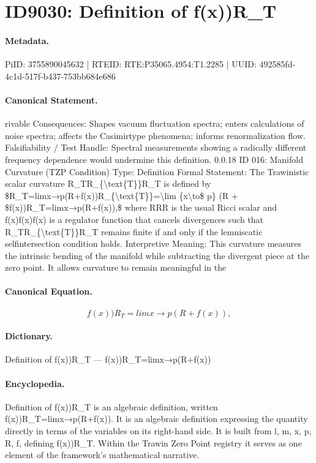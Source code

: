 \section*{ID9030: Definition of f(x))R\_T}
\paragraph{Metadata.}
PiID: 3755890045632 | RTEID: RTE:P35065.4954:T1.2285 | UUID: 492585fd-4c1d-517f-b437-753bb684e686

\paragraph{Canonical Statement.}
rivable Consequences: Shapes vacuum fluctuation spectra; enters calculations of noise spectra; affects the Casimirtype phenomena; informs renormalization flow. Falsifiability / Test Handle: Spectral measurements showing a radically different frequency dependence would undermine this definition. 0.0.18 ID 016: Manifold Curvature (TZP Condition) Type: Definition Formal Statement: The Trawinistic scalar curvature R\_TR\_\{\textbackslash{}text\{T\}\}R\_T is defined by \$R\_T=limx→p(R+f(x))R\_\{\textbackslash{}text\{T\}\}=\textbackslash{}lim \{x\textbackslash{}to\$ p\} (R + \$f(x))R\_T=limx→p(R+f(x)),\$ where RRR is the usual Ricci scalar and f(x)f(x)f(x) is a regulator function that cancels divergences such that R\_TR\_\{\textbackslash{}text\{T\}\}R\_T remains finite if and only if the lemniscatic selfintersection condition holds. Interpretive Meaning: This curvature measures the intrinsic bending of the manifold while subtracting the divergent piece at the zero point. It allows curvature to remain meaningful in the

\paragraph{Canonical Equation.}
\[
f(x))R_T=limx→p(R+f(x)),
\]

\paragraph{Dictionary.}
Definition of f(x))R\_T — f(x))R\_T=limx→p(R+f(x))

\paragraph{Encyclopedia.}
Definition of f(x))R\_T is an algebraic definition, written f(x))R\_T=limx→p(R+f(x)). It is an algebraic definition expressing the quantity directly in terms of the variables on its right-hand side. It is built from l, m, x, p, R, f, defining f(x))R\_T. Within the Trawin Zero Point registry it serves as one element of the framework's mathematical narrative.

